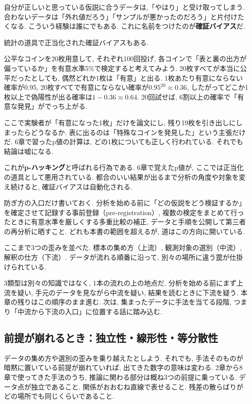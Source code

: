 自分が正しいと思っている仮説に合うデータは,「やはり」と受け取ってしまう.
合わないデータは「外れ値だろう」「サンプルが悪かったのだろう」と片付けたくなる.
こういう経験は誰にでもある. これに名前をつけたのが\textbf{確証バイアス}だ.

統計の道具で正当化された確証バイアスもある.

公平なコインを20枚用意して, それぞれ100回投げ, 各コインで「表と裏の出方が偏っているか」を有意水準5\%で検定すると考えてみよう.
20枚すべてが本当に公平だったとしても, 偶然どれか1枚は「有意」と出る.
1枚あたり有意にならない確率が0.95, 20枚すべてで有意にならない確率が$0.95^{20} \approx 0.36$, したがってどこか1枚以上で偽陽性が出る確率は$1 - 0.36 \approx 0.64$.
20回試せば, 6割以上の確率で「有意な発見」がでっち上がる.

ここで実験者が「有意になった1枚」だけを論文にし, 残り19枚を引き出しにしまったらどうなるか.
表に出るのは「特殊なコインを発見した」という主張だけだ.
6章で習ったp値の計算は, どの1枚についても正しく行われている.
それでも結論は嘘になる.

これが\textbf{p-ハッキング}と呼ばれる行為である.
6章で覚えたp値が, ここでは正当化の道具として悪用されている.
都合のいい結果が出るまで分析の角度や対象を変え続けると, 確証バイアスは自動化される.

防ぎ方の入口だけ書いておく.
分析を始める前に「どの仮説をどう検証するか」を確定させて記録する事前登録（pre-registration）, 複数の検定をまとめて行ったときに有意水準を厳しくする多重比較の補正, データと手順を公開して第三者の再分析に晒すこと.
どれも本書の範囲を超えるが, 道はこの方向に開いている.

ここまで3つの歪みを並べた.
標本の集め方（上流）, 観測対象の選別（中流）, 解釈の仕方（下流）.
データが流れる順番に沿って, 別々の場所に違う罠が仕掛けられている.

3類型は別々の知識ではなく, 1本の流れの上の地点だ.
分析を始める前にまず上流を疑い, 手元のデータを見ながら中流を疑い, 結果を読むときに下流を疑う.
本章の残りはこの順序のまま進む.
次は, 集まったデータに手法を当てる段階, つまり「中流から下流の入口」に位置する話に踏み込む.


\subsection{前提が崩れるとき：独立性・線形性・等分散性}

データの集め方や選別の歪みを乗り越えたとしよう.
それでも, 手法そのものが暗黙に置いている前提が崩れていれば, 出てきた数字の意味は変わる.
2章から8章で使ってきた手法のうち, 推論に関わる部分は概ね3つの前提に乗っている.
データ点が独立であること. 関係がおおむね直線で表せること. 残差の散らばりがどの場所でも同じくらいであること.

